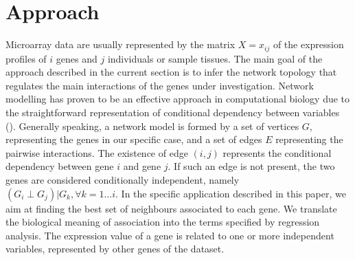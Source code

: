 \section{Approach}\label{approach}
Microarray data are usually represented by the matrix $X = x_{ij}$ of the expression profiles of $i$ genes and $j$ individuals or sample tissues. 
The main goal of the approach described in the current section is to infer the network topology that regulates the main interactions of the genes under investigation. 
Network modelling has proven to be an effective approach in computational biology due to the straightforward representation of conditional dependency between variables (\citealp{netmedicine1, netmedicine2}). Generally speaking, a network model is formed by a set of vertices $G$, representing the genes in our specific case, and a set of edges $E$ representing the pairwise interactions. The existence of edge $(i,j)$ represents the conditional dependency between gene $i$ and gene $j$.  If such an edge is not present, the two genes are considered conditionally independent, namely $(G_i \perp G_j) | G_k, \forall k=1...i$.
In the specific application described in this paper, we aim at finding the best set of neighbours associated to each gene. We translate the biological meaning of association into the terms specified by regression analysis. The expression value of a gene is related to one or more independent variables, represented by other genes of the dataset. 

